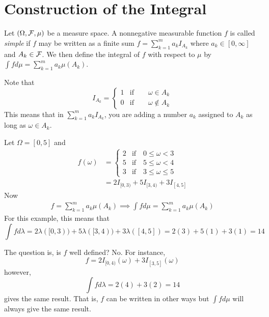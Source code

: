 \chapter{Construction of the Integral}

\begin{definition}
Let $(\Omega, \mathcal F, \mu)$ be a measure space. A nonnegative measurable function $f$ is called \emph{simple} if $f$ may be written as a finite sum $f=\sum_{k=1}^{m}a_kI_{A_k}$ where $a_k\in[0,\infty]$ and $A_k\in\mathcal F$. We then define the integral of $f$ with respect to $\mu$ by $\int fd\mu=\sum_{k=1}^{m}a_k\mu(A_k)$.
\end{definition}



Note that 
\begin{equation*}
I_{A_k}=
\begin{cases}
1 &\text{if}\qquad \omega\in A_k\\
0 &\text{if}\qquad \omega\notin A_k
\end{cases}
\end{equation*}
This means that in $\sum_{k=1}^m a_kI_{A_k}$, you are adding a number $a_k$ assigned to $A_k$ as long as $\omega\in A_k$.

\begin{example}
Let $\Omega=[0,5]$ and 
\begin{align*}
f(\omega)&=
	\begin{cases}
	2 & \text{if}\quad 0\leq \omega <3\\
	5 & \text{if}\quad 5\leq \omega <4\\
	3 & \text{if}\quad 3\leq \omega \leq 5
	\end{cases}\\
	&=2I_{[0,3)}+5I_{[3,4)}+3I_{[4,5]}
\end{align*}
Now 
\begin{align*}
f=\sum_{k=1}^{m} a_k\mu(A_k)\implies \int fd\mu = \sum_{k=1}^{m} a_k\mu(A_k)
\end{align*}
For this example, this means that 
\begin{equation*}
\int fd\lambda = 2\lambda([0,3))+5\lambda([3,4))+3\lambda([4,5])=2(3)+5(1)+3(1)=14
\end{equation*}
\end{example}

The question is, is $f$ well defined? No. For instance, 
\begin{equation*}
f=2I_{[0,4)}(\omega)+3I_{[3,5]}(\omega)
\end{equation*}
however,
\begin{equation*}
\int fd\lambda = 2(4)+3(2)=14
\end{equation*}
gives the same result. That is, $f$ can be written in other ways but $\int fd\mu$ will always give the same result.

